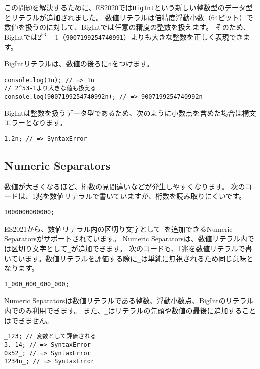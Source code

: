 この問題を解決するために、ES2020では\texttt{BigInt}という新しい整数型のデータ型とリテラルが追加されました。
数値リテラルは倍精度浮動小数（64ビット）で数値を扱うのに対して、BigIntでは任意の精度の整数を扱えます。
そのため、BigIntでは$2^{53}-1$（\texttt{9007199254740991}）よりも大きな整数を正しく表現できます。

BigIntリテラルは、数値の後ろに\texttt{n}をつけます。

\begin{lstlisting}
console.log(1n); // => 1n
// 2^53-1より大きな値も扱える
console.log(9007199254740992n); // => 9007199254740992n
\end{lstlisting}

BigIntは整数を扱うデータ型であるため、次のように小数点を含めた場合は構文エラーとなります。

\begin{lstlisting}
1.2n; // => SyntaxError
\end{lstlisting}

\hypertarget{numeric-separators}{%
\subsection[Numeric Separators]{Numeric Separators\,\protect{}}\label{numeric-separators}}

数値が大きくなるほど、桁数の見間違いなどが発生しやすくなります。
次のコードは、1兆を数値リテラルで書いていますが、桁数を読み取りにくいです。

\begin{lstlisting}
1000000000000;
\end{lstlisting}

ES2021から、数値リテラル内の区切り文字として\texttt{\_}を追加できるNumeric Separatorsがサポートされています。
Numeric Separatorsは、数値リテラル内では区切り文字として\texttt{\_}が追加できます。
次のコードも、1兆を数値リテラルで書いています。数値リテラルを評価する際に\texttt{\_}は単純に無視されるため同じ意味となります。

\begin{lstlisting}
1_000_000_000_000;
\end{lstlisting}

Numeric Separatorsは数値リテラルである整数、浮動小数点、BigIntのリテラル内でのみ利用できます。
また、\texttt{\_}はリテラルの先頭や数値の最後に追加することはできません。

\begin{lstlisting}
_123; // 変数として評価される
3._14; // => SyntaxError
0x52_; // => SyntaxError
1234n_; // => SyntaxError
\end{lstlisting}

